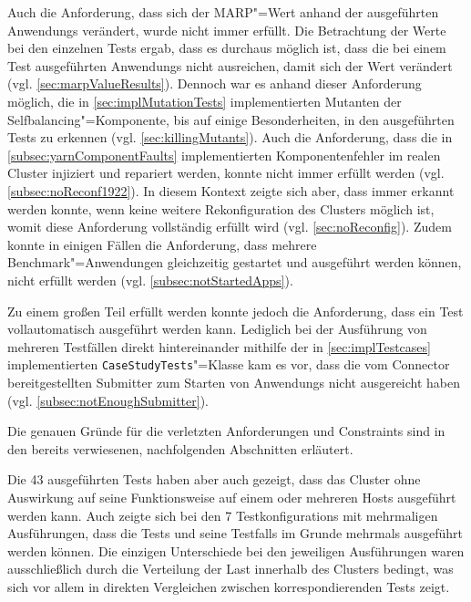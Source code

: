 Auch die Anforderung, dass sich der MARP"=Wert anhand der ausgeführten \glspl{Anwendung} verändert, wurde nicht immer erfüllt.
Die Betrachtung der Werte bei den einzelnen \glspl{Test} ergab, dass es durchaus möglich ist, dass die bei einem \gls{Test} ausgeführten \glspl{Anwendung} nicht ausreichen, damit sich der Wert verändert (vgl. \cref{sec:marpValueResults}).
Dennoch war es anhand dieser Anforderung möglich, die in \cref{sec:implMutationTests} implementierten Mutanten der Selfbalancing"=Komponente, bis auf einige Besonderheiten, in den ausgeführten \glspl{Test} zu erkennen (vgl. \cref{sec:killingMutants}).
Auch die Anforderung, dass die in \cref{subsec:yarnComponentFaults} implementierten Komponentenfehler im realen Cluster injiziert und repariert werden, konnte nicht immer erfüllt werden (vgl. \cref{subsec:noReconf1922}).
In diesem Kontext zeigte sich aber, dass immer erkannt werden konnte, wenn keine weitere Rekonfiguration des Clusters möglich ist, womit diese Anforderung vollständig erfüllt wird (vgl. \cref{sec:noReconfig}).
Zudem konnte in einigen Fällen die Anforderung, dass mehrere Benchmark"=Anwendungen gleichzeitig gestartet und ausgeführt werden können, nicht erfüllt werden (vgl. \cref{subsec:notStartedApps}).

Zu einem großen Teil erfüllt werden konnte jedoch die Anforderung, dass ein \gls{Test} vollautomatisch ausgeführt werden kann.
Lediglich bei der Ausführung von mehreren Testfällen direkt hintereinander mithilfe der in \cref{sec:implTestcases} implementierten \texttt{CaseStudyTests}"=Klasse kam es vor, dass die vom Connector bereitgestellten Submitter zum Starten von \glspl{Anwendung} nicht ausgereicht haben (vgl. \cref{subsec:notEnoughSubmitter}).

Die genauen Gründe für die verletzten Anforderungen und Constraints sind in den bereits verwiesenen, nachfolgenden Abschnitten erläutert.

Die 43 ausgeführten \glspl{Test} haben aber auch gezeigt, dass das Cluster ohne Auswirkung auf seine Funktionsweise auf einem oder mehreren Hosts ausgeführt werden kann.
Auch zeigte sich bei den 7 \glspl{Testkonfiguration} mit mehrmaligen Ausführungen, dass die \glspl{Test} und seine \glspl{Testfall} im Grunde mehrmals ausgeführt werden können.
Die einzigen Unterschiede bei den jeweiligen Ausführungen waren ausschließlich durch die Verteilung der Last innerhalb des Clusters bedingt, was sich vor allem in direkten Vergleichen zwischen korrespondierenden \glspl{Test} zeigt.
